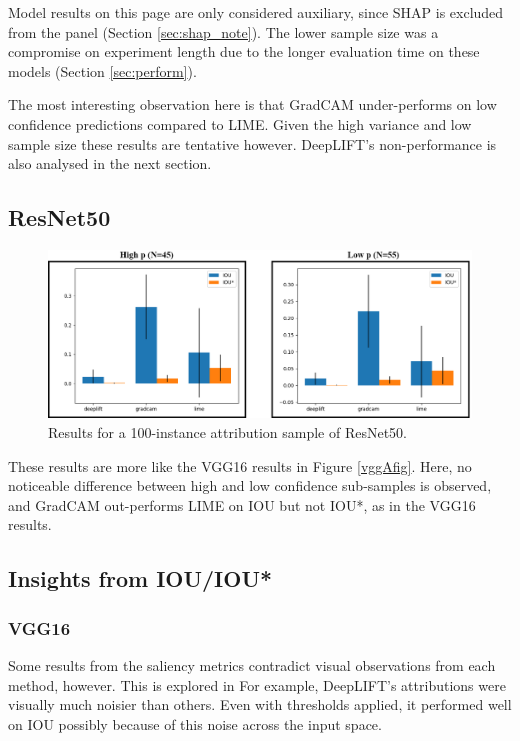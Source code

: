 \documentclass[main]{subfiles}
\begin{document}
Model results on this page are only considered auxiliary, since SHAP is excluded from the panel (Section \ref{sec:shap_note}). The lower sample size was a compromise on experiment length due to the longer evaluation time on these models (Section \ref{sec:perform}).

The most interesting observation here is that GradCAM under-performs on low confidence predictions compared to LIME. Given the high variance and low sample size these results are tentative however. DeepLIFT's non-performance is also analysed in the next section.

\subsection{ResNet50}

\begin{figure}[h]
\centering
\includegraphics[scale=0.35]{resnet.png}
\caption{Results for a 100-instance attribution sample of ResNet50. }
\label{resnetFig}
\end{figure}

These results are more like the VGG16 results in Figure \ref{vggAfig}. Here, no noticeable difference between high and low confidence sub-samples is observed, and GradCAM out-performs LIME on IOU but not IOU*, as in the VGG16 results.


\newpage
\subsection{Insights from IOU/IOU*} \label{sec:saliency_insights}

\subsubsection{VGG16}


Some results from the saliency metrics contradict visual observations from each method, however. This is explored in  For example, DeepLIFT's attributions were visually much noisier than others. Even with thresholds applied, it performed well on IOU possibly because of this noise across the input space.
\end{document}
